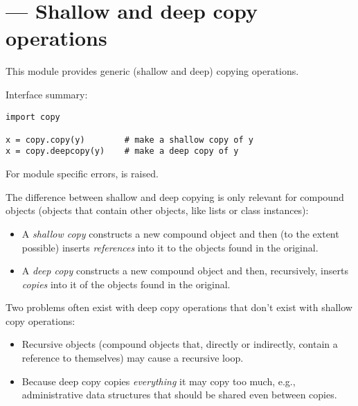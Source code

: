 \section{ ---
         Shallow and deep copy operations}



This module provides generic (shallow and deep) copying operations.

Interface summary:

\begin{verbatim}
import copy

x = copy.copy(y)        # make a shallow copy of y
x = copy.deepcopy(y)    # make a deep copy of y
\end{verbatim}
%
For module specific errors,  is raised.

The difference between shallow and deep copying is only relevant for
compound objects (objects that contain other objects, like lists or
class instances):

\begin{itemize}

\item
A \emph{shallow copy} constructs a new compound object and then (to the
extent possible) inserts \emph{references} into it to the objects found
in the original.

\item
A \emph{deep copy} constructs a new compound object and then,
recursively, inserts \emph{copies} into it of the objects found in the
original.

\end{itemize}

Two problems often exist with deep copy operations that don't exist
with shallow copy operations:

\begin{itemize}

\item
Recursive objects (compound objects that, directly or indirectly,
contain a reference to themselves) may cause a recursive loop.

\item
Because deep copy copies \emph{everything} it may copy too much,
e.g., administrative data structures that should be shared even
between copies.

\end{itemize}

